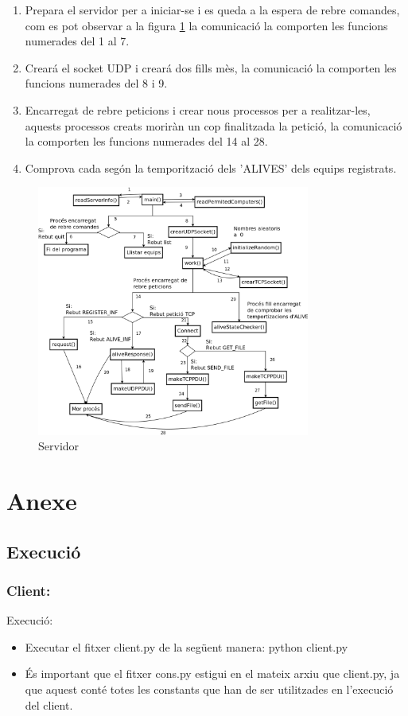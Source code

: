 \documentclass[11pt]{article}
\begin{document}
\begin{enumerate}
\item
Prepara el servidor per a iniciar-se i es queda a la espera de rebre comandes, com es pot observar a la figura \ref{fig:server} la comunicació la comporten les funcions numerades del 1 al 7.
\item
Creará el socket UDP i creará dos fills mès, la comunicació la comporten les funcions numerades del 8 i 9.
\item
Encarregat de rebre peticions i crear nous processos per a realitzar-les, aquests processos creats moriràn un cop finalitzada la petició, la comunicació la comporten les funcions numerades del 14 al 28.
\item
Comprova cada segón la temporització dels 'ALIVES' dels equips registrats.
\end{enumerate}
\newpage
\begin{figure}[h]
    \centering
    \includegraphics[width=0.8\textwidth]{server.png}
    \caption{Servidor}
    \label{fig:server}
\end{figure}
\newpage
\section{Anexe}
	\subsection{Execució}
		\subsubsection*{Client:}
Execució:
\begin{itemize}
\item Executar el fitxer client.py de la següent manera: python client.py
\item És important que el fitxer cons.py estigui en el mateix arxiu que client.py, ja que aquest conté totes les constants que han de ser utilitzades en l'execució del client.
\end{itemize}
\end{document}
